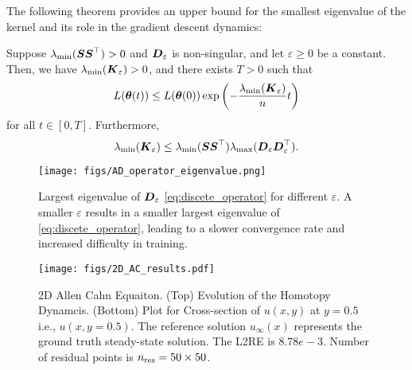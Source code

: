 The following theorem provides an upper bound for the smallest eigenvalue of the kernel and its role in the gradient descent dynamics:
\begin{theorem}\label{compare}
   Suppose \( \lambda_{\text{min}}(\boldsymbol{S}\boldsymbol{S}^{\top}) > 0 \) and \( \boldsymbol{D}_\varepsilon \) is non-singular, and let \( \varepsilon \geq 0 \) be a constant. Then, we have \( \lambda_{\text{min}}(\boldsymbol{K}_{\varepsilon}) > 0 \), and there exists \( T > 0 \) such that  
\begin{equation}
    L(\boldsymbol{\theta}(t)) \leq L(\boldsymbol{\theta}(0))\exp\left(-\frac{\lambda_{\text{min}}(\boldsymbol{K}_{\varepsilon})}{n} t\right)\label{speed}
\end{equation}
for all \( t \in [0, T] \). Furthermore,  
\begin{equation}
    \lambda_{\text{min}}(\boldsymbol{K}_{\varepsilon}) \leq \lambda_{\text{min}}(\boldsymbol{S}\boldsymbol{S}^{\top}) \lambda_{\text{max}}(\boldsymbol{D}_{\varepsilon}\boldsymbol{D}_{\varepsilon}^\top).
    \label{mineigen}
\end{equation}
\end{theorem}

\begin{figure}[t]
    \centering
    \texttt{[image: figs/AD\_operator\_eigenvalue.png]}
    \caption{Largest eigenvalue of \(\boldsymbol{D}_\varepsilon\) \eqref{eq:discete_operator} for different $\varepsilon$. A smaller $\varepsilon$ results in a smaller largest eigenvalue of \eqref{eq:discete_operator}, leading to a slower convergence rate and increased difficulty in training.}
    \label{fig:1d_allen_cahn_eigen_value}
\end{figure}
\begin{figure*}[htbp!]
    \centering
    \texttt{[image: figs/2D\_AC\_results.pdf]}
    \caption{2D Allen Cahn Equaiton. (Top) Evolution of the Homotopy Dynamcis. (Bottom) Plot for Cross-section of $u(x,y)$ at $y = 0.5$ i.e., $u(x,y=0.5)$. The reference solution $u_{\infty}(x)$ represents the ground truth steady-state solution. The L2RE is $8.78e-3$. Number of residual points is $n_\textup{res} = 50\times50$. }
\label{fig:2D_Allen_Cahn_Equation}
\end{figure*}


